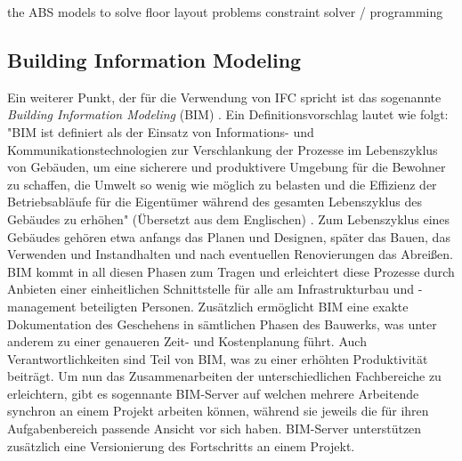the ABS models to solve floor layout problems
constraint solver / programming

\subsection{Building Information Modeling}
Ein weiterer Punkt, der für die Verwendung von IFC spricht ist das sogenannte \textit{Building Information Modeling} (BIM) \cite{Building41:online}.
Ein Definitionsvorschlag lautet wie folgt: "BIM ist definiert als der Einsatz von Informations- und Kommunikationstechnologien zur Verschlankung der Prozesse im Lebenszyklus von Gebäuden, um eine sicherere und produktivere Umgebung für die Bewohner zu schaffen, die Umwelt so wenig wie möglich zu belasten und die Effizienz der Betriebsabläufe für die Eigentümer während des gesamten Lebenszyklus des Gebäudes zu erhöhen" (Übersetzt aus dem Englischen) \cite{Microsof51:online}.
Zum Lebenszyklus eines Gebäudes gehören etwa anfangs das Planen und Designen, später das Bauen, das Verwenden und Instandhalten und nach eventuellen Renovierungen das Abreißen.
BIM kommt in all diesen Phasen zum Tragen und erleichtert diese Prozesse durch Anbieten einer einheitlichen Schnittstelle für alle am Infrastrukturbau und -management beteiligten Personen.
Zusätzlich ermöglicht BIM eine exakte Dokumentation des Geschehens in sämtlichen Phasen des Bauwerks, was unter anderem zu einer  genaueren Zeit- und Kostenplanung führt.
Auch Verantwortlichkeiten sind Teil von BIM, was zu einer erhöhten Produktivität beiträgt.
Um nun das Zusammenarbeiten der unterschiedlichen Fachbereiche zu erleichtern, gibt es sogennante BIM-Server auf welchen mehrere Arbeitende synchron an einem Projekt arbeiten können, während sie jeweils die für ihren Aufgabenbereich passende Ansicht vor sich haben.
BIM-Server unterstützen zusätzlich eine Versionierung des Fortschritts an einem Projekt.

